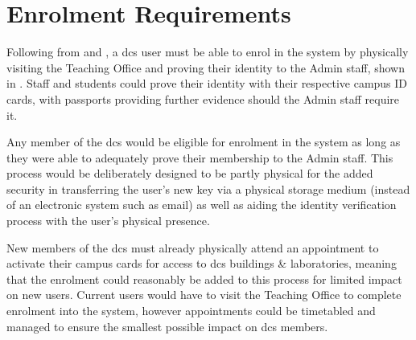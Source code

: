 \section{Enrolment Requirements}
\label{sec:analysis_enrolment}

Following from  and , a \acrfull{dcs} user must be able to enrol in the \theResServer system by physically visiting the Teaching Office and proving their identity to the Admin staff, shown in . Staff and students could prove their identity with their respective campus ID cards, with passports providing further evidence should the Admin staff require it.

Any member of the \acrfull{dcs} would be eligible for enrolment in the system as long as they were able to adequately prove their membership to the Admin staff. This process would be deliberately designed to be partly physical for the added security in transferring the user's new key via a physical storage medium (instead of an electronic system such as email) as well as aiding the identity verification process with the user's physical presence.

New members of the \acrshort{dcs} must already physically attend an appointment to activate their campus cards for access to \acrshort{dcs} buildings \& laboratories, meaning that the \theResServer enrolment could reasonably be added to this process for limited impact on new users. Current users would have to visit the Teaching Office to complete enrolment into the system, however appointments could be timetabled and managed to ensure the smallest possible impact on \acrshort{dcs} members.
